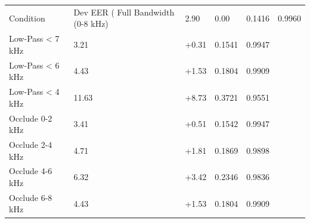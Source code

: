 \begin{tabular}{lllll}
\toprule
Condition & Dev EER (%
\midrule
Full Bandwidth (0-8 kHz) & 2.90 & 0.00 & 0.1416 & 0.9960 \\
Low-Pass < 7 kHz & 3.21 & +0.31 & 0.1541 & 0.9947 \\
Low-Pass < 6 kHz & 4.43 & +1.53 & 0.1804 & 0.9909 \\
Low-Pass < 4 kHz & 11.63 & +8.73 & 0.3721 & 0.9551 \\
Occlude 0-2 kHz & 3.41 & +0.51 & 0.1542 & 0.9947 \\
Occlude 2-4 kHz & 4.71 & +1.81 & 0.1869 & 0.9898 \\
Occlude 4-6 kHz & 6.32 & +3.42 & 0.2346 & 0.9836 \\
Occlude 6-8 kHz & 4.43 & +1.53 & 0.1804 & 0.9909 \\
\bottomrule
\end{tabular}

